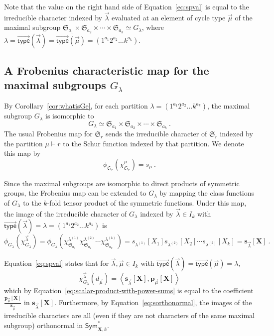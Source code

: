 \documentclass[10pt]{amsart}
\theoremstyle{definition}
\theoremstyle{remark}
\newcommand{\vtype}{\overrightarrow{\mathsf{type}}}
\newcommand{\XXX}{\mathbf{X}}
\begin{document}
Note that the value on the right hand side of Equation~\eqref{eq:spval}
is equal to the irreducible character indexed by $\vec{\lambda}$
evaluated at an element of cycle type $\vec{\mu}$ of the maximal subgroup
$\mathfrak{S}_{a_1} \times \mathfrak{S}_{a_2} \times \cdots \times \mathfrak{S}_{a_k} \simeq
G_\lambda$, where $\lambda = \vtype(\vec{\lambda}) = \vtype(\vec{\mu})=(1^{a_1} 2^{a_2} \ldots k^{a_k})$.

\subsection{A Frobenius characteristic map for the maximal subgroups $G_\lambda$}
By Corollary~\ref{cor:whatisGe},
for each partition $\lambda = (1^{a_1}2^{a_2}\ldots k^{a_k})$,
the maximal subgroup $G_\lambda$ is isomorphic to
\[
    G_\lambda \simeq
    \mathfrak{S}_{a_1} \times \mathfrak{S}_{a_2} \times \cdots \times \mathfrak{S}_{a_k}~.
\]
The usual Frobenius map for $\mathfrak{S}_r$ sends the irreducible character of $\mathfrak{S}_r$
indexed by the partition $\mu \vdash r$ to the Schur function indexed
by that partition.  We denote this map by
\[
    \phi_{\mathfrak{S}_r}( \chi^\mu_{\mathfrak{S}_r} ) = s_\mu~.
\]

Since the maximal subgroups are isomorphic to direct products of
symmetric groups, the Frobenius map can be extended to $G_\lambda$ by
mapping the class functions of $G_\lambda$
to the $k$-fold tensor product of the symmetric functions.
Under this map, the image of the irreducible character of $G_\lambda$ indexed by $\vec{\lambda} \in I_k$
with $\vtype(\vec{\lambda}) = \lambda = (1^{a_1}2^{a_2}\ldots k^{a_k})$
is
\[
    \phi_{G_\lambda}\left( \chi^{\vec{\lambda}}_{G_\lambda}\right) =
    \phi_{G_\lambda}\left( \chi^{\lambda^{(1)}}_{\mathfrak{S}_{a_1}}
    \chi^{\lambda^{(2)}}_{\mathfrak{S}_{a_2}}
    \cdots
    \chi^{\lambda^{(k)}}_{\mathfrak{S}_{a_k}} \right)
    = s_{\lambda^{(1)}}[X_1] s_{\lambda^{(2)}}[X_2] \cdots s_{\lambda^{(k)}}[X_k]
    = \mathbf{s}_{\vec{\lambda}}[\XXX]~.
\]

Equation~\eqref{eq:spval} states that for $\vec{\lambda}, \vec{\mu} \in I_k$
with $\vtype(\vec{\lambda}) = \vtype(\vec{\mu}) = \lambda$,
\[
    \chi^{\vec{\lambda}}_{G_\lambda}( d_{\vec{\mu}})
    = \left< \mathbf{s}_{\vec{\lambda}}[\XXX], \mathbf{p}_{\vec{\mu}}[\XXX]\right>
\]
which by Equation~\eqref{eq:scalar-product-with-power-sums} is equal to the coefficient
$\frac{\mathbf{p}_{\vec{\mu}}[\XXX]}{\mathbf{z}_{\vec{\mu}}}$
in $\mathbf{s}_{\vec{\lambda}}[\XXX]$.
Furthermore, by Equation~\eqref{eq:sorthonormal}, the images
of the irreducible characters are all (even if they are not
characters of the same maximal subgroup)
orthonormal in $\mathsf{Sym}^{\ast}_{\XXX,k}$.
\end{document}

